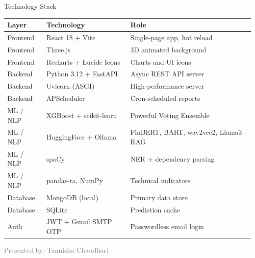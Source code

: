 \documentclass[aspectratio=169, 11pt]{beamer}
\begin{document}
\begin{frame}{Technology Stack}
\begin{center}
\renewcommand{\arraystretch}{1.25}
\small
\begin{tabular}{l l l}
\toprule
\textbf{Layer} & \textbf{Technology} & \textbf{Role} \\
\midrule
Frontend & React 18 + Vite & Single-page app, hot reload \\
Frontend & Three.js & 3D animated background \\
Frontend & Recharts + Lucide Icons & Charts and UI icons \\
\midrule
Backend & Python 3.12 + FastAPI & Async REST API server \\
Backend & Uvicorn (ASGI) & High-performance server \\
Backend & APScheduler & Cron-scheduled reports \\
\midrule
ML / NLP & XGBoost + scikit-learn & Powerful Voting Ensemble \\
ML / NLP & HuggingFace + Ollama & FinBERT, BART, wav2vec2, Llama3 RAG \\
ML / NLP & spaCy & NER + dependency parsing \\
ML / NLP & pandas-ta, NumPy & Technical indicators \\
\midrule
Database & MongoDB (local) & Primary data store \\
Database & SQLite & Prediction cache \\
\midrule
Auth & JWT + Gmail SMTP OTP & Passwordless email login \\
\bottomrule
\end{tabular}
\end{center}
\vfill
{\tiny\textcolor{gray}{Presented by: Tannisha Chaudhari}}
\end{frame}
\end{document}

